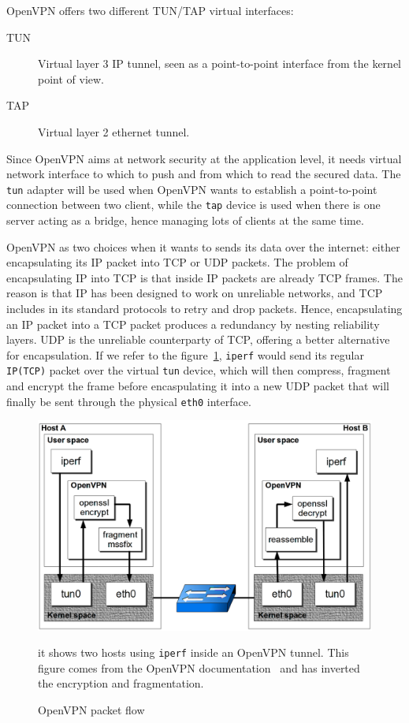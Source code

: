 OpenVPN offers two different TUN/TAP virtual interfaces:
\begin{description}
	\item[TUN] Virtual layer 3 IP tunnel, seen as a point-to-point interface from the kernel point of view.
	\item[TAP] Virtual layer 2 ethernet tunnel.
\end{description}

Since OpenVPN aims at network security at the application level, it needs virtual network interface to which to push and from which to read the secured data.
The \texttt{tun} adapter will be used when OpenVPN wants to establish a point-to-point connection between two client, while the \texttt{tap} device is used when there is one server acting as a bridge, hence managing lots of clients at the same time.

OpenVPN as two choices when it wants to sends its data over the internet: either encapsulating its IP packet into TCP or UDP packets.
The problem of encapsulating IP into TCP is that inside IP packets are already TCP frames.
The reason is that IP has been designed to work on unreliable networks, and TCP includes in its standard protocols to retry and drop packets.
Hence, encapsulating an IP packet into a TCP packet produces a redundancy by nesting reliability layers.
UDP is the unreliable counterparty of TCP, offering a better alternative for encapsulation.
If we refer to the figure~\ref{fig:openvpn-packet-flow}, \texttt{iperf} would send its regular \texttt{IP(TCP)} packet over the virtual \texttt{tun} device, which will then compress, fragment and encrypt the frame before encaspulating it into a new UDP packet that will finally be sent through the physical \texttt{eth0} interface.

\begin{figure}[ht]
\includegraphics[width=\textwidth]{OpenVPN-packetflow}
\caption{OpenVPN packet flow}{it shows two hosts using \texttt{iperf} inside an OpenVPN tunnel. This figure comes from the OpenVPN documentation~\cite{openvpn-doc-workflow} and has inverted the encryption and fragmentation.}
\label{fig:openvpn-packet-flow}
\end{figure}

